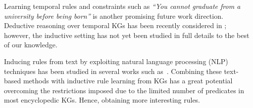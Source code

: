 Learning temporal rules and constraints such as \emph{``You cannot graduate from a university before being born''} is another promising future work direction. Deductive reasoning over temporal KGs has been recently considered in \cite{DBLP:conf/aaai/ChekolPSS17}; however, the inductive setting has not yet been studied in full details to the best of our knowledge.

 Inducing rules from text by exploiting natural language processing (NLP) techniques has been studied in several works such as~\cite{Schoenmackers:2010,Gordon:2011}. Combining these %
text-based methods with inductive rule learning from KGs has a great potential%
 overcoming the restrictions imposed due to the limited number of predicates in most encyclopedic KGs. Hence, obtaining more interesting rules. %






